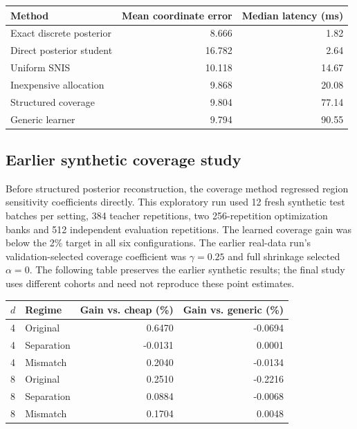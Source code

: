 \documentclass[10pt,letterpaper]{article}
\begin{document}
\begin{center}\begin{minipage}{\linewidth}\centering\small
\begin{tabular}{@{}lrr@{}}\toprule
Method & Mean coordinate error & Median latency (ms)\\\midrule
Exact discrete posterior & 8.666 & 1.82\\
Direct posterior student & 16.782 & 2.64\\
Uniform SNIS & 10.118 & 14.67\\
Inexpensive allocation & 9.868 & 20.08\\
Structured coverage & 9.804 & 77.14\\
Generic learner & 9.794 & 90.55\\\bottomrule
\end{tabular}\end{minipage}\end{center}
\subsection{Earlier synthetic coverage study}
Before structured posterior reconstruction, the coverage method regressed region sensitivity coefficients directly. This exploratory run used 12 fresh synthetic test batches per setting, 384 teacher repetitions, two 256-repetition optimization banks and 512 independent evaluation repetitions. The learned coverage gain was below the 2\% target in all six configurations. The earlier real-data run's validation-selected coverage coefficient was $\gamma=0.25$ and full shrinkage selected $\alpha=0$. The following table preserves the earlier synthetic results; the final study uses different cohorts and need not reproduce these point estimates.
\begin{center}\begin{minipage}{\linewidth}\centering\small
\begin{tabular}{@{}llrr@{}}\toprule
$d$ & Regime & Gain vs. cheap (\%) & Gain vs. generic (\%)\\\midrule
4 & Original & 0.6470 & -0.0694\\
4 & Separation & -0.0131 & 0.0001\\
4 & Mismatch & 0.2040 & -0.0134\\
8 & Original & 0.2510 & -0.2216\\
8 & Separation & 0.0884 & -0.0068\\
8 & Mismatch & 0.1704 & 0.0048\\\bottomrule
\end{tabular}\end{minipage}\end{center}
\clearpage
\end{document}
